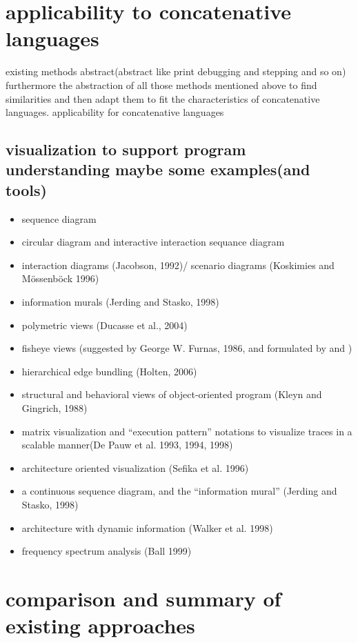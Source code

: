 \section{applicability to concatenative languages}

existing methods abstract(abstract like print debugging and stepping and so on) furthermore the abstraction of all those methods mentioned above to find similarities and then adapt them to fit the characteristics of concatenative languages.
applicability for concatenative languages

\subsection{visualization to support program understanding maybe some examples(and tools)}

\begin{itemize}
\item sequence diagram
\item circular diagram and interactive interaction sequance diagram \cite{Cornelissen2009}
\item interaction diagrams (Jacobson, 1992)/ scenario diagrams (Koskimies and Mössenböck 1996)
\item information murals (Jerding and Stasko, 1998)
\item polymetric views (Ducasse et al., 2004)
\item fisheye views (suggested by George W. Furnas, 1986, and formulated by \cite{Storey:1995:GLA:647547.728600} and \cite{Sarkar:1994:GFV:198366.198384})
\item hierarchical edge bundling (Holten, 2006)
\item structural and behavioral views of object-oriented program (Kleyn and Gingrich, 1988)
\item matrix visualization and “execution pattern” notations \cite{Pauw98executionpatterns} to visualize traces in a scalable manner(De Pauw et al. 1993, 1994, 1998) 
\item architecture oriented visualization (Sefika et al. 1996)
\item a continuous sequence diagram, and the “information mural” (Jerding and Stasko, 1998)
\item architecture with dynamic information (Walker et al. 1998)
\item frequency spectrum analysis (Ball 1999)
\end{itemize}

\section{comparison and summary of existing approaches}


